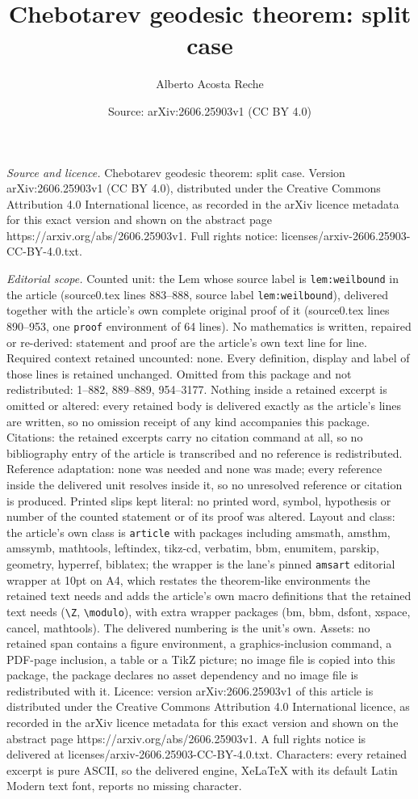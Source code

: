 \documentclass[10pt,a4paper]{amsart}
\title[Chebotarev geodesic theorem: split case]{Chebotarev geodesic theorem: split case}
\author{Alberto Acosta Reche}
\date{Source: arXiv:2606.25903v1 (CC BY 4.0)}
\begin{document}
\maketitle

\noindent\emph{Source and licence.} Chebotarev geodesic theorem: split case. Version arXiv:2606.25903v1 (CC BY 4.0), distributed under the Creative Commons Attribution 4.0 International licence, as recorded in the arXiv licence metadata for this exact version and shown on the abstract page https://arxiv.org/abs/2606.25903v1. Full rights notice: licenses/arxiv-2606.25903-CC-BY-4.0.txt.\par\smallskip

\noindent\textit{Editorial scope.} Counted unit: the Lem whose source label is \texttt{lem:weilbound} in the article (source0.tex lines 883--888, source label \texttt{lem:weilbound}), delivered together with the article's own complete original proof of it (source0.tex lines 890--953, one \texttt{proof} environment of 64 lines). No mathematics is written, repaired or re-derived: statement and proof are the article's own text line for line. Required context retained uncounted: none. Every definition, display and label of those lines is retained unchanged. Omitted from this package and not redistributed: 1--882, 889--889, 954--3177. Nothing inside a retained excerpt is omitted or altered: every retained body is delivered exactly as the article's lines are written, so no omission receipt of any kind accompanies this package. Citations: the retained excerpts carry no citation command at all, so no bibliography entry of the article is transcribed and no reference is redistributed. Reference adaptation: none was needed and none was made; every reference inside the delivered unit resolves inside it, so no unresolved reference or citation is produced. Printed slips kept literal: no printed word, symbol, hypothesis or number of the counted statement or of its proof was altered. Layout and class: the article's own class is \texttt{article} with packages including amsmath, amsthm, amssymb, mathtools, leftindex, tikz-cd, verbatim, bbm, enumitem, parskip, geometry, hyperref, biblatex; the wrapper is the lane's pinned \texttt{amsart} editorial wrapper at 10pt on A4, which restates the theorem-like environments the retained text needs and adds the article's own macro definitions that the retained text needs (\texttt{\textbackslash Z}, \texttt{\textbackslash modulo}), with extra wrapper packages (bm, bbm, dsfont, xspace, cancel, mathtools). The delivered numbering is the unit's own. Assets: no retained span contains a figure environment, a graphics-inclusion command, a PDF-page inclusion, a table or a TikZ picture; no image file is copied into this package, the package declares no asset dependency and no image file is redistributed with it. Licence: version arXiv:2606.25903v1 of this article is distributed under the Creative Commons Attribution 4.0 International licence, as recorded in the arXiv licence metadata for this exact version and shown on the abstract page https://arxiv.org/abs/2606.25903v1. A full rights notice is delivered at licenses/arxiv-2606.25903-CC-BY-4.0.txt. Characters: every retained excerpt is pure ASCII, so the delivered engine, XeLaTeX with its default Latin Modern text font, reports no missing character.
\end{document}
